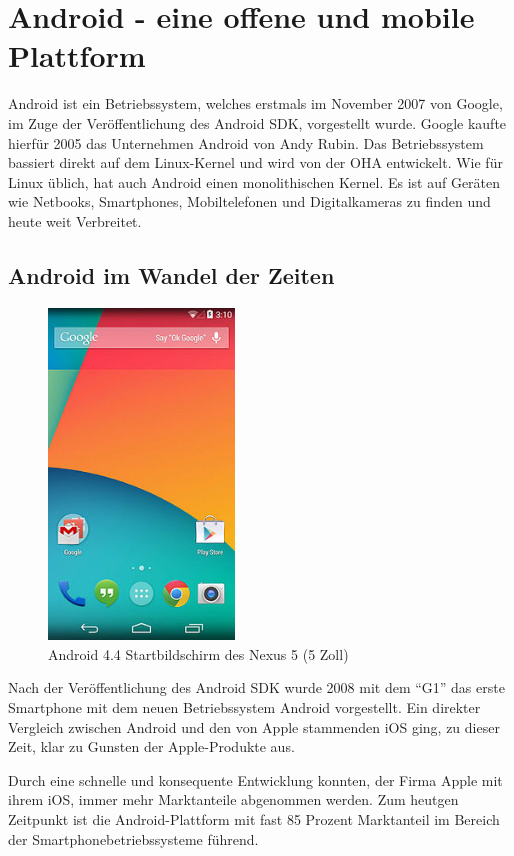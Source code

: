 \section{Android - eine offene und mobile Plattform}
Android ist ein Betriebssystem, welches erstmals im November 2007 von Google, im Zuge der Ver\"offentlichung des Android \ac{SDK}, vorgestellt wurde. Google kaufte hierf\"ur 2005 das Unternehmen Android von Andy Rubin. Das Betriebssystem bassiert direkt auf dem Linux-Kernel und wird von der \ac{OHA} entwickelt. Wie f\"ur Linux \"ublich, hat auch Android einen monolithischen Kernel. Es ist auf Ger\"aten wie Netbooks, Smartphones, Mobiltelefonen und Digitalkameras zu finden und heute weit Verbreitet. \cite{Kuehn12}

\subsection{Android im Wandel der Zeiten}
\begin{figure}
\vspace{-13pt}
\includegraphics[width=4.95cm]{Bilder/Android4.jpg}
\caption{Android 4.4 Startbildschirm des Nexus 5 (5 Zoll) \cite{WikiAndroid}}
\label{Startbildschirm des Nexus 5}
\vspace{-20pt}
\end{figure}
Nach der Ver\"offentlichung des Android \ac{SDK} wurde 2008 mit dem "`G1"' das erste Smartphone mit dem neuen Betriebssystem Android vorgestellt. Ein direkter Vergleich zwischen Android und den von Apple stammenden iOS ging, zu dieser Zeit, klar zu Gunsten der Apple-Produkte aus.
 
Durch eine schnelle und konsequente Entwicklung konnten, der Firma Apple mit ihrem iOS, immer mehr Marktanteile abgenommen werden. Zum heutgen Zeitpunkt ist die Android-Plattform mit fast 85 Prozent Marktanteil im Bereich der Smartphonebetriebssysteme f\"uhrend. \cite{GolemMobileBetriebssystem}

